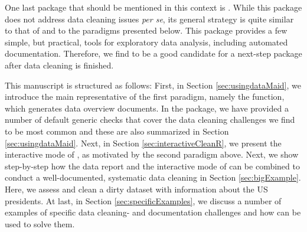 \documentclass[article,shortnames]{jss}
\begin{document}

One last package that should be mentioned in this context is
 \citep{DataExplorer}. While this package does not
address data cleaning issues \emph{per se}, its general strategy is
quite similar to that of  and to the paradigms presented
below. This package provides a few simple, but practical, tools for
exploratory data analysis, including automated
documentation. Therefore, we find  to be a good
candidate for a next-step package after data cleaning is finished.



This manuscript is structured as follows: First, in Section
\ref{sec:usingdataMaid}, we introduce the main representative of the first
paradigm, namely the  function, which generates data
overview documents. In the  package, we have
provided a number of default generic checks that cover the data
cleaning challenges we find to be most common and these are also summarized in Section \ref{sec:usingdataMaid}. Next, in Section
\ref{sec:interactiveCleanR}, we present the interactive mode of , as motivated
by the second paradigm above. Next, we show step-by-step how the data report and the interactive mode of  can be combined to conduct a well-documented, systematic data cleaning in Section \ref{sec:bigExample}. Here, we assess and clean a dirty dataset with information about the US presidents.  At last, in Section \ref{sec:specificExamples}, we discuss a number of examples of
specific data cleaning- and documentation challenges and how  can be used to
solve them. 
\end{document}
